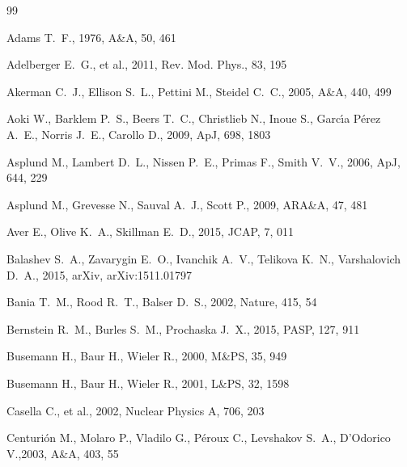 \documentclass[12pt,preprint,useAMS,usenatbib]{emulateapj}
\begin{document}
\begin{thebibliography}{99}

Adams T.~F., 1976, A\&A, 50, 461

Adelberger E.~G., et al., 2011, Rev. Mod. Phys., 83, 195

Akerman C.~J., Ellison S.~L., Pettini M., Steidel C.~C., 2005, A\&A, 440, 499

Aoki W., Barklem P.~S., Beers T.~C., Christlieb N., Inoue S., Garc{\'{\i}}a P{\'e}rez A.~E., Norris J.~E., Carollo D., 2009, ApJ, 698, 1803

Asplund M., Lambert D.~L., Nissen P.~E., Primas F., Smith V.~V., 2006, ApJ, 644, 229

Asplund M., Grevesse N., Sauval A.~J., Scott P., 2009, ARA\&A, 47, 481

Aver E., Olive K.~A., Skillman E.~D., 2015, JCAP, 7, 011

Balashev S.~A., Zavarygin E.~O., Ivanchik A.~V., Telikova K.~N., Varshalovich D.~A., 2015, arXiv, arXiv:1511.01797

Bania T.~M., Rood R.~T., Balser D.~S., 2002, Nature, 415, 54

Bernstein R.~M., Burles S.~M., Prochaska J.~X., 2015, PASP, 127, 911

Busemann H., Baur H., Wieler R., 2000, M\&PS, 35, 949

Busemann H., Baur H., Wieler R., 2001, L\&PS, 32, 1598

Casella C., et al., 2002, Nuclear Physics A, 706, 203

Centuri{\'o}n M., Molaro P., Vladilo G., P{\'e}roux C., Levshakov S.~A., D'Odorico V.,2003, A\&A, 403, 55


\end{thebibliography}
\end{document}
